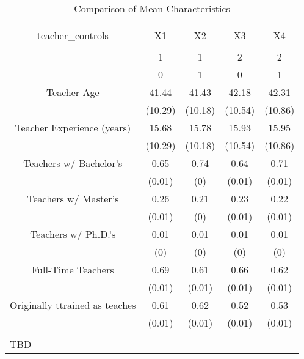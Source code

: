 
\begin{table}[!htbp] \centering 
  \caption{Comparison of Mean Characteristics} 
  \label{Tab1} 
\scriptsize 
\begin{tabular}{@{\extracolsep{5pt}} ccccc} 
\\[-1.8ex]\hline 
\hline \\[-1.8ex] 
teacher\_controls & X1 & X2 & X3 & X4 \\ 
\hline \\[-1.8ex] 
 & 1 & 1 & 2 & 2 \\ 
 & 0 & 1 & 0 & 1 \\ 
Teacher Age & 41.44 & 41.43 & 42.18 & 42.31 \\ 
 & (10.29) & (10.18) & (10.54) & (10.86) \\ 
Teacher Experience (years) & 15.68 & 15.78 & 15.93 & 15.95 \\ 
 & (10.29) & (10.18) & (10.54) & (10.86) \\ 
Teachers w/ Bachelor's & 0.65 & 0.74 & 0.64 & 0.71 \\ 
 & (0.01) & (0) & (0.01) & (0.01) \\ 
Teachers w/ Master's & 0.26 & 0.21 & 0.23 & 0.22 \\ 
 & (0.01) & (0) & (0.01) & (0.01) \\ 
Teachers w/ Ph.D.'s & 0.01 & 0.01 & 0.01 & 0.01 \\ 
 & (0) & (0) & (0) & (0) \\ 
Full-Time Teachers & 0.69 & 0.61 & 0.66 & 0.62 \\ 
 & (0.01) & (0.01) & (0.01) & (0.01) \\ 
Originally ttrained as teaches & 0.61 & 0.62 & 0.52 & 0.53 \\ 
 & (0.01) & (0.01) & (0.01) & (0.01) \\ 
\hline \\[-1.8ex] 
\multicolumn{5}{l}{TBD} \\ 
\end{tabular} 
\end{table} 
